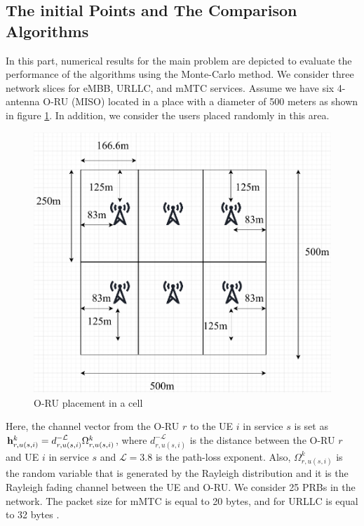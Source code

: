 \documentclass[lettersize,journal]{IEEEtran}
\begin{document}
\subsection{The initial Points and The Comparison Algorithms}
In this part, numerical results for the main problem are depicted to evaluate the performance of the algorithms using the Monte-Carlo method. We consider three network slices for eMBB, URLLC, and mMTC services.
Assume we have six 4-antenna O-RU (MISO) located in a place with a diameter of 500 meters as shown in figure \ref{fig:cell}. In addition, we consider the users placed randomly in this area.
\begin{figure}
  \centering
    \includegraphics[scale = 0.3]{cell.pdf}
  \caption{O-RU placement in a cell}
  \label{fig:cell}
\end{figure}
Here, the channel vector from the O-RU $r$ to the UE $i$ in service $s$ is set as $\bold{h}_{r,u(s,i)}^{k}=d_{r,u(s,i)}^{-\mathcal{L}} \Omega_{r,u(s,i)}^{k} $, where $d_{r,u(s,i)}^{-\mathcal{L}} $ is the distance between the O-RU $r$ and UE $i$ in service $s$ and $\mathcal{L} = 3.8$ is the path-loss exponent.%
Also, $\Omega_{r,u(s,i)}^{k}$ is the random variable that is generated by the Rayleigh distribution and it is the Rayleigh fading channel between the UE and O-RU.
We consider 25 PRBs in the network. The packet size for mMTC is equal to 20 bytes, and for URLLC is equal to 32 bytes \cite{ETSI1}.
\end{document}

